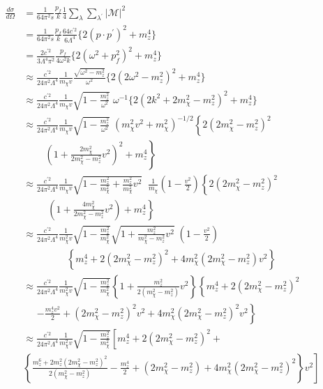 \documentclass[12pt]{report}
\begin{document}
\begin{align*}
\frac{d \sigma}{d \Omega} & = \frac{1}{64 \pi^2 s} \frac{p_f}{k} \frac{1}{4} \sum_\lambda \sum_{\lambda^\prime} |\mathcal{M}|^2 \\
&=\frac{1}{64 \pi^2 s} \frac{p_f}{k}  \frac{64 c^{\prime 2}}{6\Lambda^4} \{ 2(p \cdot p^\prime)^2 +m_z^4\}\\
&= \frac{2c^{\prime 2}}{3\Lambda^4 \pi^2} \frac{p_f}{4 \omega^2 k} \{ 2 (\omega^2 +p_f^2)^2 +m_z^4 \} \\
&\approx \frac{c^{\prime 2}}{24 \pi^2 \Lambda^4}  \frac{1}{m_\chi v} \frac{\sqrt{\omega^2 -m^2_z}}{\omega^2} \{ 2(2 \omega^2 -m_z^2 )^2 +m_z^4 \} \\
&\approx \frac{c^{\prime 2}}{24 \pi^2 \Lambda^4}  \frac{1}{m_\chi v} \sqrt{1-\frac{m^2_z}{\omega^2}} \; \omega^{-1}  \{ 2(2k^2 + 2 m^2_\chi -m^2_z)^2 +m^4_z \}\\
&\approx \frac{c^{\prime 2}}{24 \pi^2 \Lambda^4}  \frac{1}{m_\chi v} \sqrt{1-\frac{m^2_z}{\omega^2}} \; (m^2_\chi v^2 + m^2_\chi )^{- 1/2} \left\{  2 (2m^2_\chi - m^2_z)^2 \right. \\
& \;\;\;\;\;\;\;\; \left. \left( 1+ \frac{2m^2_\chi}{2m^2_\chi - m^2_z} v^2 \right)^2 +m^4_z \right\} \\
&\approx\frac{c^{\prime 2}}{24 \pi^2 \Lambda^4}  \frac{1}{m_\chi v} \sqrt{1-\frac{m^2_z}{m^2_\chi}+\frac{m^2_z}{m^2_\chi}v^2}\; \; \frac{1}{m_\chi} \left(1-\frac{v^2}{2}\right) \left\{  2 (2m^2_\chi - m^2_z)^2 \right.\\
&\;\;\;\;\;\;\;\; \;\left. \left( 1+ \frac{4m^2_\chi}{2m^2_\chi - m^2_z} v^2 \right) +m^4_z \right\} \\
&\approx \frac{c^{\prime 2}}{24 \pi^2 \Lambda^4} \frac{1}{m_\chi^2 v} \sqrt{1-\frac{m^2_z}{m^2_\chi}} \sqrt{1+\frac{m^2_z}{m^2_\chi - m^2_z} v^2}\; \left(1-\frac{v^2}{2}\right) \\
& \;\;\;\;\;\; \;\;\;\;\;\;\;\;\;\; \left\{ m^4_z + 2(2 m^2_\chi - m^2_z)^2 + 4m^2_\chi (2m^2_\chi -m^2_z) v^2 \right\}\\
&\approx \frac{c^{\prime 2}}{24 \pi^2 \Lambda^4}  \frac{1}{m^2_\chi v} \sqrt{1-\frac{m^2_z}{m^2_\chi}} \left\{ 1+\frac{m^2_z}{2(m^2_\chi-m^2_z)} v^2 \right\} \left\{ m^4_z + 2(2m^2_\chi - m^2_z)^2 \right.\\
& \;\;\;\;\; \left. - \frac{m^4_z v^2}{2} + (2 m^2_\chi - m^2_z)^2 v^2 + 4 m^2_\chi ( 2 m^2_\chi - m^2_z )^2 v^2 \right\} \\
&\approx  \frac{c^{\prime 2}}{24 \pi^2 \Lambda^4}  \frac{1}{m^2_\chi v}  \sqrt{1-\frac{m^2_z}{m^2_\chi}} \left[ m^4_z + 2(2 m^2_\chi -m^2_z)^2 + \right. \\
& \left. \left\{ \frac{ m^6_z+2 m^2_z (2 m^2_\chi - m^2_z)^2 }{2(m^2_\chi - m^2_z)} -\frac{m^4_z}{2} + (2 m^2_\chi - m^2_z) + 4 m^2_\chi (2 m^2_\chi - m^2_z)^2 \right\} v^2  \right]
\end{align*}
\end{document}
